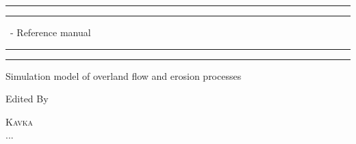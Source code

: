 

\begin{titlepage} %

	\centering %
	
	\scshape %
	
	\vspace*{\baselineskip} %
	
	
	\rule{\textwidth}{0pt}\vspace*{-\baselineskip}\vspace*{2pt} %
	\rule{\textwidth}{0.4pt} %
	
	\vspace{0.75\baselineskip} %
	
	{\LARGE \smod\ - Reference manual} %
	
	\vspace{0.75\baselineskip} %
	
	\rule{\textwidth}{0.4pt}\vspace*{-\baselineskip}\vspace{3.2pt} %
	\rule{\textwidth}{0pt} %
	
	\vspace{2\baselineskip} %
	
	
	Simulation model of overland flow and erosion processes
	
	\vspace*{3\baselineskip} %
	
	
	Edited By
	
	\vspace{0.5\baselineskip} %
	
	{\scshape\Large Kavka \\ ... \\} %
	

\end{titlepage}
